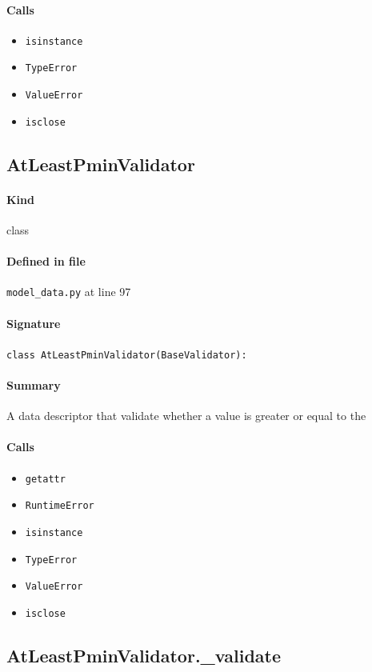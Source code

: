 \documentclass[11pt]{report}
\begin{document}
\paragraph{Calls}
\begin{itemize}[leftmargin=*]
  \item \texttt{isinstance}
  \item \texttt{TypeError}
  \item \texttt{ValueError}
  \item \texttt{isclose}
\end{itemize}
\subsection{AtLeastPminValidator}
\label{def:model_data.py:AtLeastPminValidator:L97}
\paragraph{Kind} class
\paragraph{Defined in file} \texttt{model\_data.py} at line 97
\paragraph{Signature} \texttt{class AtLeastPminValidator(BaseValidator):}
\paragraph{Summary} A data descriptor that validate whether a value is greater or equal to the
\paragraph{Calls}
\begin{itemize}[leftmargin=*]
  \item \texttt{getattr}
  \item \texttt{RuntimeError}
  \item \texttt{isinstance}
  \item \texttt{TypeError}
  \item \texttt{ValueError}
  \item \texttt{isclose}
\end{itemize}
\subsection{AtLeastPminValidator.\_validate}
\label{def:model_data.py:AtLeastPminValidator._validate:L104}
\end{document}
